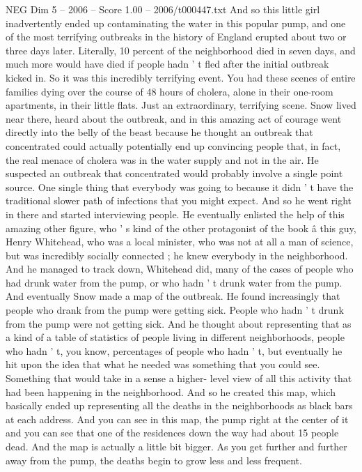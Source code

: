 \begin{textsample}{NEG Dim 5 – 2006 – Score 1.00 – 2006/t000447.txt}
And so this little girl inadvertently ended up contaminating the water in this popular pump, and one of the most terrifying outbreaks in the history of England erupted about two or three days later.
Literally, 10 percent of the neighborhood died in seven days, and much more would have died if people hadn ' t fled after the initial outbreak kicked in.
So it was this incredibly terrifying event.
You had these scenes of entire families dying over the course of 48 hours of cholera, alone in their one-room apartments, in their little flats.
Just an extraordinary, terrifying scene.
Snow lived near there, heard about the outbreak, and in this amazing act of courage went directly into the belly of the beast because he thought an outbreak that concentrated could actually potentially end up convincing people that, in fact, the real menace of cholera was in the water supply and not in the air.
He suspected an outbreak that concentrated would probably involve a single point source.
One single thing that everybody was going to because it didn ' t have the traditional slower path of infections that you might expect.
And so he went right in there and started interviewing people.
He eventually enlisted the help of this amazing other figure, who ' s kind of the other protagonist of the book â this guy, Henry Whitehead, who was a local minister, who was not at all a man of science, but was incredibly socially connected ; he knew everybody in the neighborhood.
And he managed to track down, Whitehead did, many of the cases of people who had drunk water from the pump, or who hadn ' t drunk water from the pump.
And eventually Snow made a map of the outbreak.
He found increasingly that people who drank from the pump were getting sick.
People who hadn ' t drunk from the pump were not getting sick.
And he thought about representing that as a kind of a table of statistics of people living in different neighborhoods, people who hadn ' t, you know, percentages of people who hadn ' t, but eventually he hit upon the idea that what he needed was something that you could see.
Something that would take in a sense a higher- level view of all this activity that had been happening in the neighborhood.
And so he created this map, which basically ended up representing all the deaths in the neighborhoods as black bars at each address.
And you can see in this map, the pump right at the center of it and you can see that one of the residences down the way had about 15 people dead.
And the map is actually a little bit bigger.
As you get further and further away from the pump, the deaths begin to grow less and less frequent.

\end{textsample}
